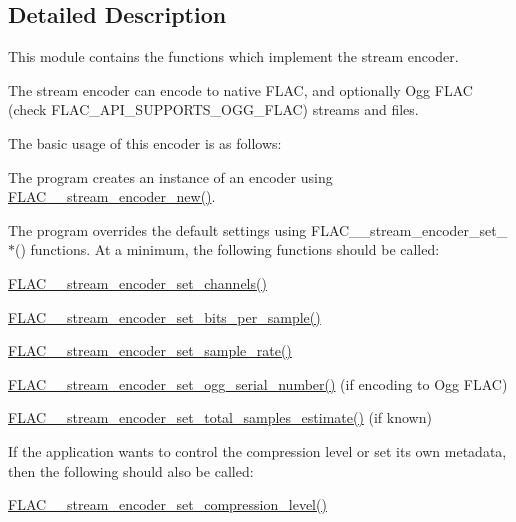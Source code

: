 \subsection{Detailed Description}
This module contains the functions which implement the stream encoder. 

The stream encoder can encode to native F\+L\+AC, and optionally Ogg F\+L\+AC (check F\+L\+A\+C\+\_\+\+A\+P\+I\+\_\+\+S\+U\+P\+P\+O\+R\+T\+S\+\_\+\+O\+G\+G\+\_\+\+F\+L\+AC) streams and files.

The basic usage of this encoder is as follows\+:
\begin{DoxyItemize}
\item The program creates an instance of an encoder using \mbox{\hyperlink{group__flac__stream__encoder_ga35f3d94452bcf0a90a31c7d770b200bc}{F\+L\+A\+C\+\_\+\+\_\+stream\+\_\+encoder\+\_\+new()}}.
\item The program overrides the default settings using F\+L\+A\+C\+\_\+\+\_\+stream\+\_\+encoder\+\_\+set\+\_\+$\ast$() functions. At a minimum, the following functions should be called\+:
\begin{DoxyItemize}
\item \mbox{\hyperlink{group__flac__stream__encoder_gabfc9c883c124a849b5b42a87c30e10a5}{F\+L\+A\+C\+\_\+\+\_\+stream\+\_\+encoder\+\_\+set\+\_\+channels()}}
\item \mbox{\hyperlink{group__flac__stream__encoder_ga5a21cf7f86a81df6ba72714a6b917aa3}{F\+L\+A\+C\+\_\+\+\_\+stream\+\_\+encoder\+\_\+set\+\_\+bits\+\_\+per\+\_\+sample()}}
\item \mbox{\hyperlink{group__flac__stream__encoder_ga108c3f4fbdcaa744ddbb125f91cb3838}{F\+L\+A\+C\+\_\+\+\_\+stream\+\_\+encoder\+\_\+set\+\_\+sample\+\_\+rate()}}
\item \mbox{\hyperlink{group__flac__stream__encoder_ga646c9800d42620a6c504fbdfbd092666}{F\+L\+A\+C\+\_\+\+\_\+stream\+\_\+encoder\+\_\+set\+\_\+ogg\+\_\+serial\+\_\+number()}} (if encoding to Ogg F\+L\+AC)
\item \mbox{\hyperlink{group__flac__stream__encoder_ga0d3f45052f2f7379c73e2b027c7f956c}{F\+L\+A\+C\+\_\+\+\_\+stream\+\_\+encoder\+\_\+set\+\_\+total\+\_\+samples\+\_\+estimate()}} (if known)
\end{DoxyItemize}
\item If the application wants to control the compression level or set its own metadata, then the following should also be called\+:
\begin{DoxyItemize}
\item \mbox{\hyperlink{group__flac__stream__encoder_ga03495bcd0aae71116c701b0dcf311c4b}{F\+L\+A\+C\+\_\+\+\_\+stream\+\_\+encoder\+\_\+set\+\_\+compression\+\_\+level()}}

\end{DoxyItemize}
\end{DoxyItemize}
